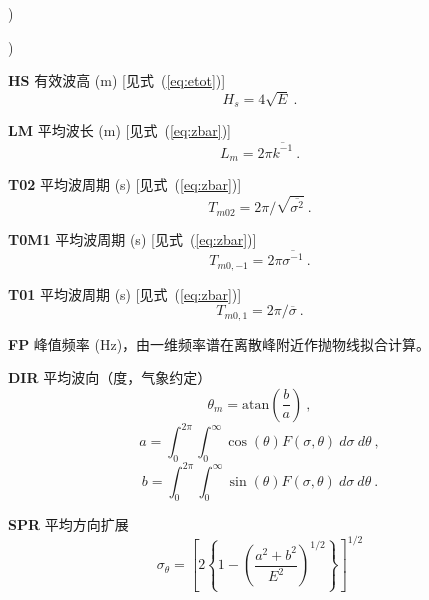 \begin{list}{)\hfill}
\begin{list}{)\hfill}
            { \leftmargin 8mm 
             \rightmargin 0mm \itemsep 0mm \parsep 0mm}
\item \textbf{HS} 有效波高 (m) [见式~(\ref{eq:etot})]
      \begin{equation} H_s = 4 \sqrt{E} \: . \label{eq:Hs} \end{equation}
\item \textbf{LM} 平均波长 (m) [见式~(\ref{eq:zbar})]
      \begin{equation} L_m = 2\pi \overline{k^{-1}}
      \: . \label{eq:Lm} \end{equation}
\item \textbf{T02} 平均波周期 (s) [见式~(\ref{eq:zbar})]
      \begin{equation} T_{m02} = 2\pi /\sqrt{\overline{\sigma^{2}}}
      \: . \label{eq:Tm02} \end{equation}
\item \textbf{T0M1} 平均波周期 (s) [见式~(\ref{eq:zbar})]
      \begin{equation} T_{m0,-1} = 2\pi \overline{\sigma^{-1}}
      \: . \label{eq:Tm0m1} \end{equation}
\item \textbf{T01} 平均波周期 (s) [见式~(\ref{eq:zbar})]
      \begin{equation} T_{m0,1} = 2\pi /\overline{\sigma}
      \: . \label{eq:Tm} \end{equation}
\item \textbf{FP} 峰值频率 (Hz)，由一维频率谱在离散峰附近作抛物线拟合计算。
\item \textbf{DIR} 平均波向（度，气象约定）
      \begin{equation} \theta_m = \mbox{atan} \left ( \frac{b}{a} \right )
      \: , \label{eq:theta_m} \end{equation} \begin{equation}
      a = \int_0^{2\pi} \int_0^\infty \cos(\theta) F(\sigma,\theta) \:
      d\sigma \: d\theta \: , \end{equation} \begin{equation}
      b = \int_0^{2\pi} \int_0^\infty \sin(\theta) F(\sigma,\theta) \:
      d\sigma \: d\theta \: . \end{equation}
\item \textbf{SPR} 平均方向扩展 \citep[度；][]{art:KVH88}
      \begin{equation} \sigma_\theta = \left [ 2 \left \{ 1 - \left (
      \frac{a^2+b^2}{E^2} \right )^{1/2} \right \} \right ]^{1/2}

\end{equation}
\end{list}
\end{list}
